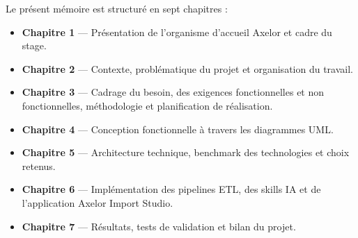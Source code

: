 Le présent mémoire est structuré en sept chapitres :

\begin{itemize}
  \item \textbf{Chapitre 1} — Présentation de l'organisme d'accueil Axelor et cadre du stage.
  \item \textbf{Chapitre 2} — Contexte, problématique du projet et organisation du travail.
  \item \textbf{Chapitre 3} — Cadrage du besoin, des exigences fonctionnelles et non fonctionnelles, méthodologie et planification de réalisation.
  \item \textbf{Chapitre 4} — Conception fonctionnelle à travers les diagrammes UML.
  \item \textbf{Chapitre 5} — Architecture technique, benchmark des technologies et choix retenus.
  \item \textbf{Chapitre 6} — Implémentation des pipelines ETL, des skills IA et de l'application Axelor Import Studio.
  \item \textbf{Chapitre 7} — Résultats, tests de validation et bilan du projet.
\end{itemize}
